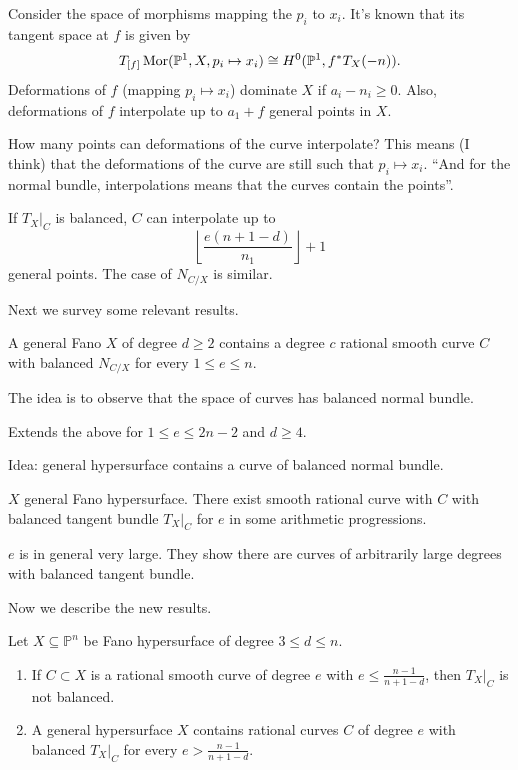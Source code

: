 Consider the space of morphisms mapping
the  $p_i$ to $x_i$. It's known that its
tangent space
at $f$
is given by
$$
T_{[f]}\mathop{\mathrm{Mor}}\nolimits(\mathbb{P}^1,X,p_i \mapsto x_i)
\cong H^0(\mathbb{P}^1,f^*T_X(-n)).
$$
\noindent
Deformations of $f$ (mapping $p_i \mapsto
x_i$)
dominate $X$ if $a_i-n_i \geq 0$.
Also, deformations of $f$ interpolate up
to $a_1+f$ general points in $X$.

\medskip\noindent
How many points can deformations of the curve
interpolate?
This means (I think) that the deformations of
the curve
are still such that $p_i \mapsto  x_i$.
``And for the normal bundle, interpolations
means that the curves contain the points''.

If $T_X|_{C}$ is balanced, $C$ can
interpolate up to
$$
\left\lfloor \frac{e(n+1-d)}{n_1}
\right\rfloor +1
$$
general points. The case of $N_{C/X}$ is
similar.

\medskip\noindent
Next we survey some relevant results.

\begin{theorem}
\label{theorem-CR18}
A general Fano $X$ of degree $d \geq 2$
contains a degree $c$ rational smooth curve
 $C$ with balanced $N_{C/X}$
for every $1 \leq e \leq  n$.
\end{theorem}

The idea is to observe that the space of
curves has
balanced normal bundle.

\begin{theorem}[Ran, 2021]
\label{theorem-R21}
Extends the above for
$1 \leq  e \leq 2n-2$
and $d \geq 4$.
\end{theorem}

Idea: general hypersurface contains a curve
of balanced normal bundle.

\begin{theorem}[Ran, 2024]
\label{theorem-R24}
$X$ general Fano hypersurface.
There exist smooth rational curve with  $C$
with balanced tangent bundle $T_{X}|_{C}$
for $e$ in some arithmetic progressions.
\end{theorem}

$e$ is in general very large.
They show there are curves of arbitrarily
large
degrees with balanced tangent bundle.

\medskip\noindent
Now we describe the new results.

\begin{theorem}
\label{theorem-Lucas}
Let $X \subseteq \mathbb{P}^n$ be Fano
hypersurface of degree $3 \leq d \leq n$.

\begin{enumerate}
\item If $C \subset X$ is a rational smooth
curve
of degree $e$ with
$e \leq  \frac{n-1}{n+1-d}$,
then $T_X|_{C}$ is not balanced.

\item A general hypersurface $X$
contains rational curves $C$
of degree $e$ with balanced
$T_X|_{C}$ for every
$e> \frac{n-1}{n+1-d}$.
\end{enumerate}
\end{theorem}

